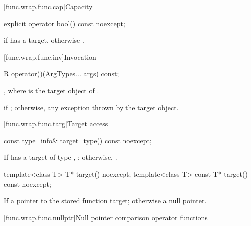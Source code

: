 [func.wrap.func.cap]{Capacity}

%
\begin{itemdecl}
explicit operator bool() const noexcept;
\end{itemdecl}

\begin{itemdescr}
\pnum
\returns
{} if  has a target, otherwise .
\end{itemdescr}

[func.wrap.func.inv]{Invocation}

%
%
\begin{itemdecl}
R operator()(ArgTypes... args) const;
\end{itemdecl}

\begin{itemdescr}
\pnum
\returns
{},
where  is the target object of .

\pnum
\throws
{} if ; otherwise, any
exception thrown by the target object.
\end{itemdescr}

[func.wrap.func.targ]{Target access}

%
\begin{itemdecl}
const type_info& target_type() const noexcept;
\end{itemdecl}

\begin{itemdescr}
\pnum
\returns
If  has a target of type ,
  ; otherwise, .
\end{itemdescr}

%
\begin{itemdecl}
template<class T>       T* target() noexcept;
template<class T> const T* target() const noexcept;
\end{itemdecl}

\begin{itemdescr}
\pnum
\returns
If 
a pointer to the stored function target; otherwise a null pointer.
\end{itemdescr}

[func.wrap.func.nullptr]{Null pointer comparison operator functions}

